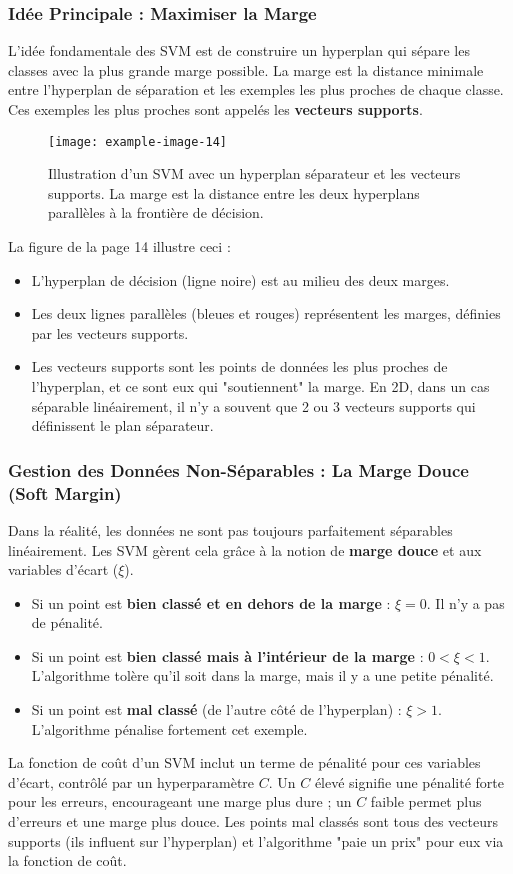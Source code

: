 \documentclass{article}
\begin{document}
\subsubsection{Idée Principale : Maximiser la Marge}
L'idée fondamentale des SVM est de construire un hyperplan qui sépare les classes avec la plus grande marge possible. La marge est la distance minimale entre l'hyperplan de séparation et les exemples les plus proches de chaque classe. Ces exemples les plus proches sont appelés les \textbf{vecteurs supports}.
\begin{figure}[h!]
    \centering
    \texttt{[image: example-image-14]} %
    \caption{Illustration d'un SVM avec un hyperplan séparateur et les vecteurs supports. La marge est la distance entre les deux hyperplans parallèles à la frontière de décision.}
\end{figure}
La figure de la page 14 illustre ceci :
\begin{itemize}
    \item L'hyperplan de décision (ligne noire) est au milieu des deux marges.
    \item Les deux lignes parallèles (bleues et rouges) représentent les marges, définies par les vecteurs supports.
    \item Les vecteurs supports sont les points de données les plus proches de l'hyperplan, et ce sont eux qui "soutiennent" la marge. En 2D, dans un cas séparable linéairement, il n'y a souvent que 2 ou 3 vecteurs supports qui définissent le plan séparateur.
\end{itemize}

\subsubsection{Gestion des Données Non-Séparables : La Marge Douce (Soft Margin)}
Dans la réalité, les données ne sont pas toujours parfaitement séparables linéairement. Les SVM gèrent cela grâce à la notion de \textbf{marge douce} et aux variables d'écart ($\xi$).
\begin{itemize}
    \item Si un point est \textbf{bien classé et en dehors de la marge} : $\xi = 0$. Il n'y a pas de pénalité.
    \item Si un point est \textbf{bien classé mais à l'intérieur de la marge} : $0 < \xi < 1$. L'algorithme tolère qu'il soit dans la marge, mais il y a une petite pénalité.
    \item Si un point est \textbf{mal classé} (de l'autre côté de l'hyperplan) : $\xi > 1$. L'algorithme pénalise fortement cet exemple.
\end{itemize}
La fonction de coût d'un SVM inclut un terme de pénalité pour ces variables d'écart, contrôlé par un hyperparamètre $C$. Un $C$ élevé signifie une pénalité forte pour les erreurs, encourageant une marge plus dure ; un $C$ faible permet plus d'erreurs et une marge plus douce.
Les points mal classés sont tous des vecteurs supports (ils influent sur l'hyperplan) et l'algorithme "paie un prix" pour eux via la fonction de coût.
\end{document}
